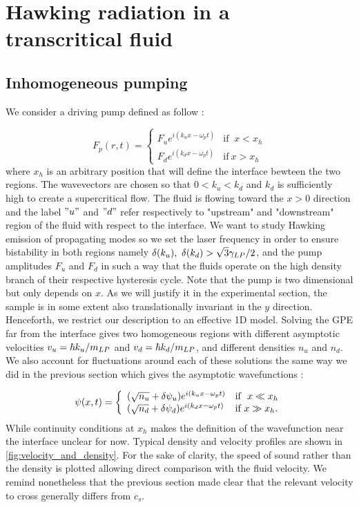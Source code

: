 \section{Hawking radiation in a transcritical fluid}
 


\subsection{Inhomogeneous pumping}
We consider a driving pump defined as follow :

\begin{equation}
    F_p(r,t) = \left\{
        \begin{array}{ll}
            F_ue^{i(k_ux-\omega_p t)} & \mbox{if } \ x<x_h \\
            F_de^{i(k_dx-\omega_p t)} & \mbox{if} \ x>x_h
        \end{array}
    \right.
\end{equation}
where $x_h$ is an arbitrary position that will define the interface bewteen the two regions. The wavevectors are chosen so that $0<k_u<k_d$ and $k_d$ is sufficiently high to create a supercritical flow. The fluid is 
flowing toward the $x>0$ direction and the label $"u"$ and $"d"$ refer respectively to "upstream" and "downstream" region of the fluid with respect to the interface. We want to study Hawking emission of propagating modes so we set 
the laser frequency in order to ensure bistability in both regions namely $\delta(k_u),\ \delta(k_d)>\sqrt{3}\gamlp/2$, and the pump amplitudes $F_u$ and $F_d$ in such a way that the fluids operate on the high density branch of their 
respective hysteresis cycle. Note that the pump is two dimensional but only depends on $x$. As we will justify it in the experimental section, the sample is in some extent also translationally invariant in the $y$ direction. Henceforth, we restrict our description to an effective 1D model.
Solving the GPE far from the interface gives two homogeneous regions with different asymptotic velocities $v_u=\hbar k_u/m_{LP}$ and $v_d=\hbar k_d/m_{LP}$, and different densities $n_u$ and $n_d$. We also 
account for fluctuations around each of these solutions the same way we did in the previous section which gives the asymptotic wavefunctions :

\begin{equation}
    \psi(x,t) = \left\{
        \begin{array}{ll}
            (\sqrt{n_u}+\dpsi_u)e^{i(k_ux-\omega_p t)} & \mbox{if } \ x \ll x_h \\
            (\sqrt{n_d}+\dpsi_d)e^{i(k_dx-\omega_p t)} & \mbox{if} \ x \gg x_h.
        \end{array}
    \right.
\end{equation}
While continuity conditions at $x_h$ makes the definition of the wavefunction near the interface unclear for now.
Typical density and velocity profiles are shown in \autoref{fig:velocity_and_density}. For the sake of clarity, the speed of sound rather than the density is plotted allowing direct comparison with 
the fluid velocity. We remind nonetheless that the previous section made clear that the relevant velocity to cross generally differs from $c_s$.

